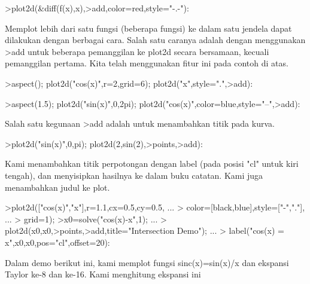 \documentclass[12pt,arial,letterpaper]{book}
\begin{document}
\begin{eulercomment}
\begin{eulercomment}
\begin{eulercomment}
\begin{eulercomment}
\begin{eulercomment}
\begin{eulercomment}
\begin{eulercomment}
\begin{eulercomment}
\begin{eulercomment}
\begin{eulercomment}
\begin{eulercomment}
\begin{eulercomment}
\begin{eulercomment}
\begin{eulercomment}
\begin{eulercomment}
\begin{eulercomment}
\begin{eulerprompt}
>plot2d(&diff(f(x),x),>add,color=red,style="-.-"):
\end{eulerprompt}
\begin{eulercomment}
Memplot lebih dari satu fungsi (beberapa fungsi) ke dalam satu jendela
dapat dilakukan dengan berbagai cara. Salah satu caranya adalah dengan
menggunakan \textgreater{}add untuk beberapa pemanggilan ke plot2d secara
bersamaan, kecuali pemanggilan pertama. Kita telah menggunakan fitur
ini pada contoh di atas.
\end{eulercomment}
\begin{eulerprompt}
>aspect(); plot2d("cos(x)",r=2,grid=6); plot2d("x",style=".",>add):
\end{eulerprompt}
\begin{eulerprompt}
>aspect(1.5); plot2d("sin(x)",0,2pi); plot2d("cos(x)",color=blue,style="--",>add):
\end{eulerprompt}
\begin{eulercomment}
Salah satu kegunaan \textgreater{}add adalah untuk menambahkan titik pada kurva.
\end{eulercomment}
\begin{eulerprompt}
>plot2d("sin(x)",0,pi); plot2d(2,sin(2),>points,>add):
\end{eulerprompt}
\begin{eulercomment}
Kami menambahkan titik perpotongan dengan label (pada posisi "cl"
untuk kiri tengah), dan menyisipkan hasilnya ke dalam buku catatan.
Kami juga menambahkan judul ke plot.
\end{eulercomment}
\begin{eulerprompt}
>plot2d(["cos(x)","x"],r=1.1,cx=0.5,cy=0.5, ...
>  color=[black,blue],style=["-","."], ...
>  grid=1);
>x0=solve("cos(x)-x",1);  ...
>  plot2d(x0,x0,>points,>add,title="Intersection Demo");  ...
>  label("cos(x) = x",x0,x0,pos="cl",offset=20):
\end{eulerprompt}
\begin{eulercomment}
Dalam demo berikut ini, kami memplot fungsi sinc(x)=sin(x)/x dan
ekspansi Taylor ke-8 dan ke-16. Kami menghitung ekspansi ini

\end{eulercomment}
\end{eulercomment}
\end{eulercomment}
\end{eulercomment}
\end{eulercomment}
\end{eulercomment}
\end{eulercomment}
\end{eulercomment}
\end{eulercomment}
\end{eulercomment}
\end{eulercomment}
\end{eulercomment}
\end{eulercomment}
\end{eulercomment}
\end{eulercomment}
\end{eulercomment}
\end{eulercomment}
\end{document}
